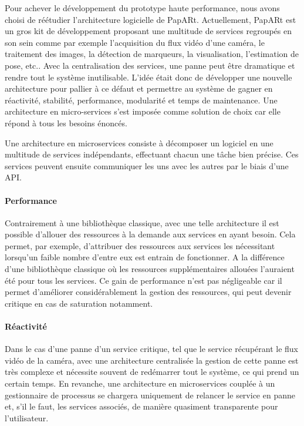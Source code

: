Pour achever le développement du prototype haute performance, nous avons choisi de réétudier l'architecture logicielle de PapARt. 
Actuellement, PapARt est un gros kit de développement proposant une multitude de services regroupés en son sein comme par exemple l'acquisition du flux vidéo d'une caméra, le traitement des images, la détection de marqueurs, la visualisation, l'estimation de pose, etc.. Avec la centralisation des services, une panne peut être dramatique et rendre tout le système inutilisable. L'idée était donc de développer une nouvelle architecture pour pallier à ce défaut et permettre au système de gagner en réactivité, stabilité, performance, modularité et temps de maintenance. Une architecture en micro-services s'est imposée comme solution de choix car elle répond à tous les besoins énoncés.

Une architecture en microservices consiste à décomposer un logiciel en une multitude de services indépendants, effectuant chacun une tâche bien précise. Ces services peuvent ensuite communiquer les uns avec les autres par le biais d'une API.

\paragraph{Performance} Contrairement à une bibliothèque classique, avec une telle architecture il est possible d'allouer des ressources à la demande aux services en ayant besoin. Cela permet, par exemple, d'attribuer des ressources aux services les nécessitant lorsqu'un faible nombre d'entre eux est entrain de fonctionner. A la différence d'une bibliothèque classique où les ressources supplémentaires allouées l'auraient été pour tous les services. Ce gain de performance n'est pas négligeable car il permet d'améliorer considérablement la gestion des ressources, qui peut devenir critique en cas de saturation notamment.

\paragraph{Réactivité} Dans le cas d'une panne d'un service critique, tel que le service récupérant le flux vidéo de la caméra, avec une architecture centralisée la gestion de cette panne est très complexe et nécessite souvent de redémarrer tout le système, ce qui prend un certain temps. En revanche, une architecture en microservices couplée à un gestionnaire de processus se chargera uniquement de relancer le service en panne et, s'il le faut, les services associés, de manière quasiment transparente pour l'utilisateur.

